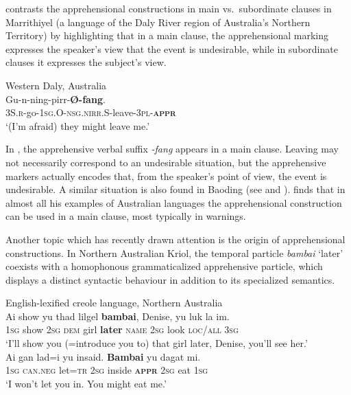 \documentclass[output=paper,colorlinks,citecolor=brown, language=chinese]{langscibook}
\begin{document}
 \citet[168]{green1989} contrasts the apprehensional constructions in main vs.\ subordinate clauses in Marrithiyel (a language of the Daly River region of Australia's Northern Territory) by highlighting that in a main clause, the apprehensional marking expresses the speaker's view that the event is undesirable, while in subordinate clauses it expresses the subject's view.

\ea
\label{ex:Song2} 
 {Western Daly, Australia}{\cite[80; 170]{green1989}} \\
\gll Gu-n-ning-pirr-\textbf{Ø-fang}. \\
\textsc{3S.r-}go-\textsc{1sg.O-nsg.nirr.S-}leave-\textsc{3pl-\textbf{appr}} \\
\glt `(I'm afraid) they might leave me.'
\z


\noindent In , the apprehensive verbal suffix \textit{-fang} appears in a main clause. Leaving may not necessarily correspond to an undesirable situation, but the apprehensive markers actually encodes that, from the speaker's point of view, the event is undesirable. A similar situation is also found in Baoding (see  and ). \citet[202]{verstraete2006b} finds that in almost all his examples of Australian languages the apprehensional construction can be used in a main clause, most typically in warnings. 

Another topic which has recently drawn attention is the origin of apprehensional constructions. In Northern Australian Kriol, the temporal particle \textit{bambai} `later' coexists with a homophonous grammaticalized apprehensive particle, which displays a distinct syntactic  behaviour in addition to its specialized semantics.

\ea 
\label{ex:Song3} 
 {English-lexified creole language, Northern Australia} {\cite[269]{AngeloSchultze-Berndt2016}} \\
\ea \label{ex:Song3a}
\gll Ai show yu thad lilgel \textbf{bambai}, Denise, yu luk la im. \\
\textsc{1sg} show \textsc{2sg} \textsc{dem} girl \textbf{later} \textsc{name} \textsc{2sg} look \textsc{loc/all} \textsc{3sg} \\
\glt `I'll show you (=introduce you to) that girl later, Denise, you'll see her.' \\
\ex \label{ex:Song3b}
\gll Ai gan lad=i yu insaid. \textbf{Bambai} yu dagat mi. \\
\textsc{1sg} \textsc{can.neg} let=\textsc{tr} \textsc{2sg} inside \textbf{\textsc{appr}} \textsc{2sg} eat \textsc{1sg} \\
\glt `I won't let you in. You might eat me.'
\z
\z
\end{document}
